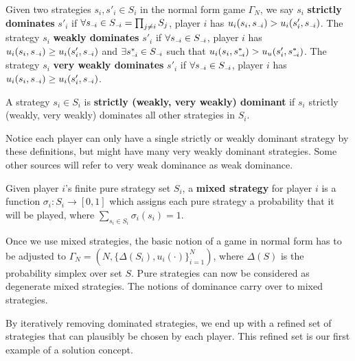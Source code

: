 \documentclass[10pt]{article}
\begin{document}
\begin{spacing}{1.0}
\begin{definition}[Domination]
  Given two strategies $s_i, s'_i \in S_i$ in the
  normal form game $\Gamma_N$, we say $s_i$ \textbf{strictly dominates}
  $s'_i$ if $\forall s_{{\scriptscriptstyle-}\!i} \in S_{{\scriptscriptstyle-}\!i} = \prod_{j\neq i} S_j$, player $i$ has
  $u_i(s_i,s_{{\scriptscriptstyle-}\!i}) > u_i(s'_i, s_{{\scriptscriptstyle-}\!i})$. The strategy $s_i$ \textbf{weakly
    dominates} $s'_i$ if $\forall s_{{\scriptscriptstyle-}\!i} \in S_{{\scriptscriptstyle-}\!i}$,
  player $i$ has $u_i(s_i,s_{{\scriptscriptstyle-}\!i}) \ge u_i(s'_i, s_{{\scriptscriptstyle-}\!i})$ and $\exists
  s^*_{{\scriptscriptstyle-}\!i} \in S_{{\scriptscriptstyle-}\!i}$ such that $u_i(s_i, s^*_{{\scriptscriptstyle-}\!i}) > u_u(s'_i,
  s^*_{{\scriptscriptstyle-}\!i})$. The strategy $s_i$ \textbf{very weakly
    dominates} $s'_i$ if $\forall s_{{\scriptscriptstyle-}\!i} \in S_{{\scriptscriptstyle-}\!i}$,
  player $i$ has $u_i(s_i,s_{{\scriptscriptstyle-}\!i}) \ge u_i(s'_i, s_{{\scriptscriptstyle-}\!i})$.
\end{definition}

\begin{definition}
  A strategy $s_i \in S_i$ is \textbf{strictly (weakly, very weakly)
    dominant} if $s_i$ strictly (weakly, very weakly) dominates all other
  strategies in $S_i$.
\end{definition}

Notice each player can only have a single strictly or weakly dominant
strategy by these definitions, but might have many very weakly dominant
strategies. Some other sources will refer to very weak dominance as weak dominance.

\begin{definition}
  Given player $i$'s finite pure
  strategy set $S_i$, a \textbf{mixed strategy} for player $i$ is
  a function $\sigma_i : S_i \to [0,1]$ which assigns
  each pure strategy a probability that it will be
  played, where $\sum_{s_i\in S_i} \sigma_i(s_i) = 1$.
\end{definition}

Once we use mixed strategies, the basic notion of a game in normal form has
to be adjusted to $\Gamma_N = \left(N, \{\Delta(S_i),
  u_i(\cdot)\}_{i=1}^N\right)$, where $\Delta(S)$ is the probability
simplex over set $S$. Pure strategies can now be considered as degenerate
mixed strategies. The notions of dominance carry over to mixed
strategies.

\hspace{1em}
By iteratively removing dominated strategies, we end up with a refined set
of strategies that can plausibly be chosen by each player. This refined set
is our first example of a solution concept.


\end{spacing}
\end{document}
